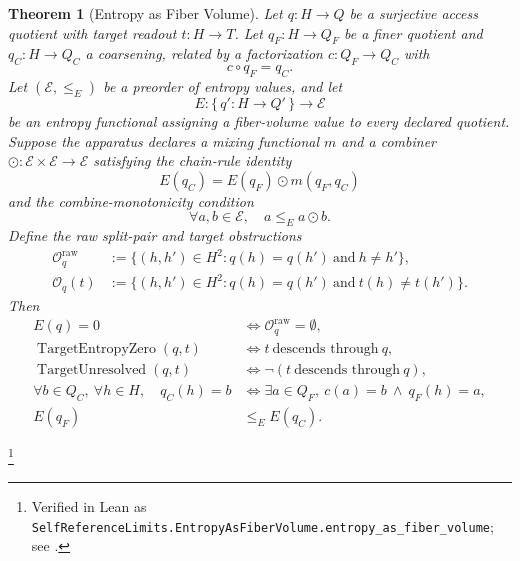 \documentclass[11pt]{article}
\newtheorem{theorem}{Theorem}[section]
\theoremstyle{definition}
\begin{document}
\begin{theorem}[Entropy as Fiber Volume]\label{thm:F39}
Let \(q:H\to Q\) be a surjective access quotient with target readout
\(t:H\to T\).  Let \(q_F:H\to Q_F\) be a finer quotient and
\(q_C:H\to Q_C\) a coarsening, related by a factorization
\(c:Q_F\to Q_C\) with
\[
  c\circ q_F=q_C.
\]
Let \((\mathcal E,\le_E)\) be a preorder of entropy values, and let
\[
  E:\{\,q':H\to Q'\,\}\longrightarrow \mathcal E
\]
be an entropy functional assigning a fiber-volume value to every
declared quotient.  Suppose the apparatus declares a mixing
functional \(m\) and a combiner
\(\odot:\mathcal E\times\mathcal E\to\mathcal E\) satisfying the
chain-rule identity
\[
  E(q_C)=E(q_F)\odot m(q_F,q_C)
\]
and the combine-monotonicity condition
\[
  \forall a,b\in\mathcal E,\quad a\le_E a\odot b.
\]
Define the raw split-pair and target obstructions
\begin{align*}
  \mathcal O_q^{\mathrm{raw}}
  &:=
  \{(h,h')\in H^2:q(h)=q(h')\ \text{and}\ h\ne h'\},\\
  \mathcal O_q(t)
  &:=
  \{(h,h')\in H^2:q(h)=q(h')\ \text{and}\ t(h)\ne t(h')\}.
\end{align*}
Then
\begin{align*}
  E(q)=0
  &\iff
  \mathcal O_q^{\mathrm{raw}}=\emptyset,\\
  \operatorname{TargetEntropyZero}(q,t)
  &\iff
  t\ \text{descends through}\ q,\\
  \operatorname{TargetUnresolved}(q,t)
  &\iff
  \neg(t\ \text{descends through}\ q),\\
  \forall b\in Q_C,\ \forall h\in H,\quad
  q_C(h)=b
  &\iff
  \exists a\in Q_F,\ c(a)=b\ \wedge\ q_F(h)=a,\\
  E(q_F)
  &\le_E
  E(q_C).
\end{align*}
\end{theorem}
\footnote{\raggedright Verified in Lean as
\texttt{SelfReferenceLimits.\allowbreak{}EntropyAsFiberVolume.\allowbreak{}entropy\_as\_fiber\_volume};
see .}
\end{document}
